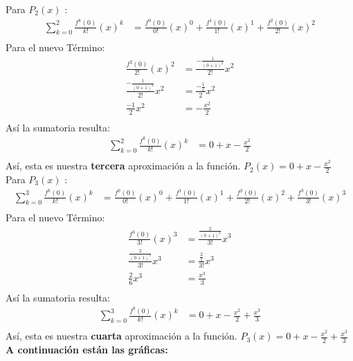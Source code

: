 Para $P_{2}(x)$ :
\begin{align*}
   \sum_{k=0}^{2} \frac{f^{k}(0)}{k!}(x)^{k} &= \frac{f^{0}(0)}{0!}(x)^{0} + \frac{f^{1}(0)}{1!}(x)^{1}  + \frac{f^{2}(0)}{2!}(x)^{2}\\
\end{align*}
Para el nuevo Término:
\begin{align*}
   \frac{f^{2}(0)}{2!}(x)^{2}                   &= \frac{-\frac{1}{(0+1)^{2}}}{2!}x^{2} \\
   \frac{-\frac{1}{(0+1)^{2}}}{2!}x^{2}         &= \frac{-\frac{1}{1}}{2}x^{2} \\
   \frac{-1}{2}x^{2}                            &= -\frac{x^{2}}{2}\\
\end{align*}
Así la sumatoria resulta:
\begin{align*}
   \sum_{k=0}^{2} \frac{f^{k}(0)}{k!}(x)^{k} &= 0 + x -\frac{x^{2}}{2}\\
\end{align*}
Así, esta es nuestra \textbf{tercera} aproximación a la función. $P_{2}(x) = 0 + x -\frac{x^{2}}{2}$ 
Para $P_{3}(x)$ :
\begin{align*}
   \sum_{k=0}^{3} \frac{f^{k}(0)}{k!}(x)^{k} &= \frac{f^{0}(0)}{0!}(x)^{0} + \frac{f^{1}(0)}{1!}(x)^{1} + \frac{f^{2}(0)}{2!}(x)^{2} + \frac{f^{3}(0)}{3!}(x)^{3}\\
\end{align*}
Para el nuevo Término:
\begin{align*}
   \frac{f^{3}(0)}{3!}(x)^{3}                   &= \frac{\frac{2}{(0+1)^{3}}}{3!}x^{3} \\
   \frac{\frac{2}{(0+1)^{3}}}{3!}x^{3}         &= \frac{\frac{2}{1}}{3!}x^{3} \\
   \frac{2}{6}x^{3}                            &= \frac{x^{3}}{3}\\
\end{align*}
Así la sumatoria resulta:
\begin{align*}
   \sum_{k=0}^{3} \frac{f^{k}(0)}{k!}(x)^{k} &= 0 + x -\frac{x^{2}}{2} + \frac{x^{3}}{3}\\
\end{align*}
Así, esta es nuestra \textbf{cuarta} aproximación a la función. $P_{3}(x) = 0 + x -\frac{x^{2}}{2} + \frac{x^{3}}{3}$ \\

\textbf{A continuación están las gráficas:} \\

